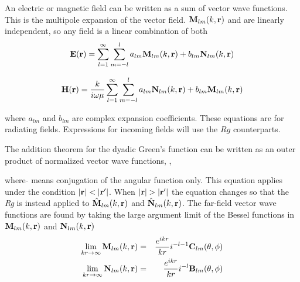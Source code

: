 An electric or magnetic field can be written as a sum of vector wave functions. This is the multipole expansion of the vector field.  $ \mathbf{M}_{lm}(k,\mathbf{r})$ and  are linearly independent, so any field is a linear combination of both 
\begin{equation}
\mathbf{E}(\mathbf{r}) = \sum_{l=1}^{\infty}\sum_{m=-l}^l a_{lm} \mathbf{M}_{lm}(k,\mathbf{r}) + b_{lm} \mathbf{N}_{lm}(k,\mathbf{r})
\end{equation}

\begin{equation}
\mathbf{H}(\mathbf{r}) = \dfrac{k}{i\omega\mu}\sum_{l=1}^{\infty}\sum_{m=-l}^l a_{lm} \mathbf{N}_{lm}(k,\mathbf{r}) + b_{lm} \mathbf{M}_{lm}(k,\mathbf{r}) \label{Halmblm}
\end{equation}

\noindent where $a_{lm}$ and $b_{lm}$ are complex expansion coefficients. These equations are for radiating fields. Expressions for incoming fields will use the $\textit{Rg}$ counterparts.  

The addition theorem for the dyadic Green's function can be written as an outer product of normalized vector wave functions, \cite{chew1995waves},

\noindent where $\hat{}$ means conjugation of the angular function only. This equation applies under the condition $\vert \mathbf{r} \vert < \vert \mathbf{r}' \vert$. When $\vert \mathbf{r} \vert > \vert \mathbf{r}' \vert$ the equation changes so that the \textit{Rg} is instead applied to $\hat{\mathbf{M}}_{lm}(k,\mathbf{r})$ and $\hat{\mathbf{N}}_{lm}(k,\mathbf{r})$. The far-field vector wave functions are found by taking the large argument limit of the Bessel functions in $\mathbf{M}_{lm}(k,\mathbf{r})$ and $\mathbf{N}_{lm}(k,\mathbf{r})$
\begin{eqnarray}
\lim_{kr \rightarrow \infty} \mathbf{M}_{lm}(k,\mathbf{r}) &=& \dfrac{e^{ikr}}{kr} i^{-l-1} \mathbf{C}_{lm}(\theta,\phi) \label{farfieldM} \\
\lim_{kr \rightarrow \infty} \mathbf{N}_{lm}(k,\mathbf{r}) &=& \dfrac{e^{ikr}}{kr} i^{-l} \mathbf{B}_{lm}(\theta,\phi) \label{farfieldN}
\end{eqnarray}

